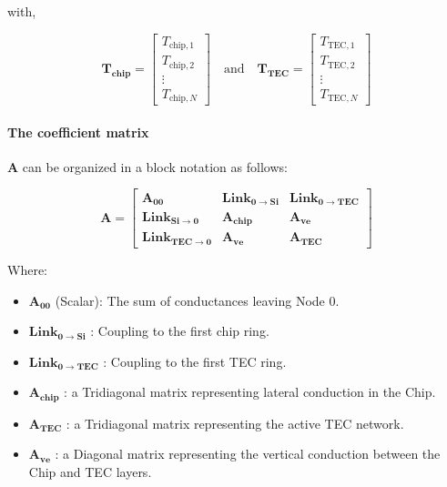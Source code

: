 \documentclass[10pt,a4paper,twocolumn]{article}
\begin{document}
with,

\begin{equation}
	\mathbf{T_{\text{chip}}}=
	\begin{bmatrix}
		T_{\text{chip},1} \\
		T_{\text{chip},2} \\
		\vdots            \\
		T_{\text{chip},N}
	\end{bmatrix}
	\quad \text{and} \quad
	\mathbf{T_{\text{TEC}}}=
	\begin{bmatrix}
		T_{\text{TEC},1} \\
		T_{\text{TEC},2} \\
		\vdots           \\
		T_{\text{TEC},N}
	\end{bmatrix}
\end{equation}

\paragraph{The coefficient matrix} $\mathbf{A}$ can be organized in a block notation as follows:

\begin{equation}
	\mathbf{A} = 
	\begin{bmatrix} \mathbf{A_{00}} & \mathbf{Link_{0 \to Si}} & \mathbf{Link_{0 \to TEC}} \\ \mathbf{Link_{Si \to 0}} & \mathbf{A_{chip}} & \mathbf{A_{ve}} \\ \mathbf{Link_{TEC \to 0}} & \mathbf{A_{ve}} & \mathbf{A_{TEC}}
	\end{bmatrix}
\end{equation}

Where: 
\begin{itemize}
	\item $\mathbf{A_{00}}$ (Scalar): The sum of conductances leaving Node 0.
	\item $\mathbf{Link_{0 \to Si}}$ : Coupling to the first chip ring.
	\item $\mathbf{Link_{0 \to TEC}}$ : Coupling to the first TEC ring.
	\item $\mathbf{A_{chip}}$ : a Tridiagonal matrix representing lateral conduction in the Chip.
	\item $\mathbf{A_{TEC}}$ : a Tridiagonal matrix representing the active TEC network.
	\item $\mathbf{A_{ve}}$ : a Diagonal matrix representing the vertical conduction between the Chip and TEC layers.
\end{itemize}
\end{document}
